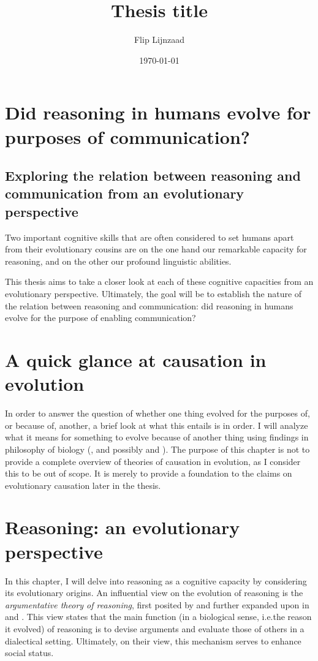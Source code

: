 \documentclass{article}
\title{Thesis title}
\author{Flip Lijnzaad}
\date{\today}
\begin{document}
\section*{\centering Did reasoning in humans evolve for purposes of communication?}
\subsection*{\centering Exploring the relation between reasoning and communication from an evolutionary perspective}
\medskip

Two important cognitive skills that are often considered to set humans apart from their evolutionary cousins are on the one hand our remarkable capacity for reasoning, and on the other our profound linguistic abilities.

This thesis aims to take a closer look at each of these cognitive capacities from an evolutionary perspective. Ultimately, the goal will be to establish the nature of the relation between reasoning and communication: did reasoning in humans evolve for the purpose of enabling communication?


\section{A quick glance at causation in evolution}

In order to answer the question of whether one thing evolved for the purposes of, or because of, another, a brief look at what this entails is in order.
I will analyze what it means for something to evolve because of another thing using findings in philosophy of biology (\citet{Ayala99}, and possibly \citet{Allen98} and \citet{Wright76}).
The purpose of this chapter is not to provide a complete overview of theories of causation in evolution, as I consider this to be out of scope. It is merely to provide a foundation to the claims on evolutionary causation later in the thesis.

\section{Reasoning: an evolutionary perspective}

In this chapter, I will delve into reasoning as a cognitive capacity by considering its evolutionary origins.
An influential view on the evolution of reasoning is the \emph{argumentative theory of reasoning}, first posited by \citet{MercierSperber11} and further expanded upon in \citet{Mercier16} and \citet{MercierSperber17}. This view states that the main function (in a biological sense, i.e.\@ the reason it evolved) of reasoning is to devise arguments and evaluate those of others in a dialectical setting. Ultimately, on their view, this mechanism serves to enhance social status.
\end{document}
